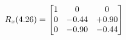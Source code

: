 \documentclass[preview]{standalone}
\begin{document}
\begin{align*}
\special{dvisvgm:raw <g id='unique000'>}R_{x}(4.26) = \begin{bmatrix}1 & 0 & 0 \\0 & -0.44 & +0.90 \\0 & -0.90 & -0.44\end{bmatrix}\special{dvisvgm:raw </g>}
\end{align*}
\end{document}
